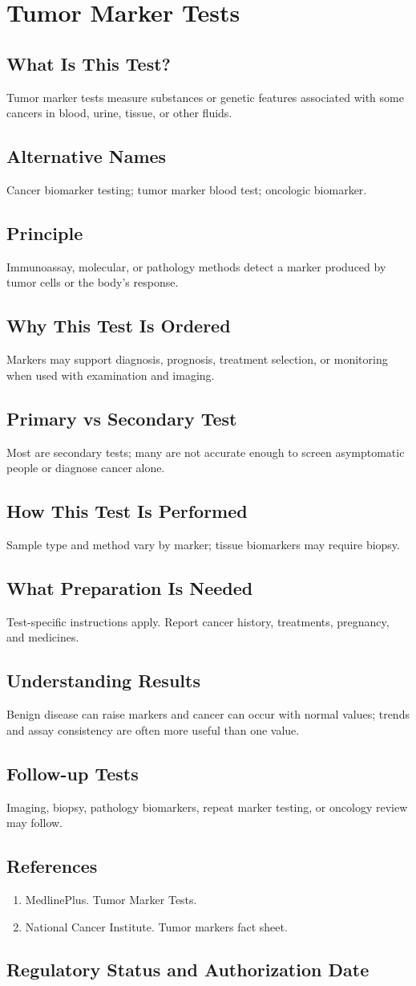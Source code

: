 \chapter{Tumor Marker Tests}
\section*{What Is This Test?} Tumor marker tests measure substances or genetic features associated with some cancers in blood, urine, tissue, or other fluids.\section*{Alternative Names} Cancer biomarker testing; tumor marker blood test; oncologic biomarker.\section*{Principle} Immunoassay, molecular, or pathology methods detect a marker produced by tumor cells or the body's response.\section*{Why This Test Is Ordered} Markers may support diagnosis, prognosis, treatment selection, or monitoring when used with examination and imaging.\section*{Primary vs Secondary Test} Most are secondary tests; many are not accurate enough to screen asymptomatic people or diagnose cancer alone.\section*{How This Test Is Performed} Sample type and method vary by marker; tissue biomarkers may require biopsy.\section*{What Preparation Is Needed} Test-specific instructions apply. Report cancer history, treatments, pregnancy, and medicines.\section*{Understanding Results} Benign disease can raise markers and cancer can occur with normal values; trends and assay consistency are often more useful than one value.\section*{Follow-up Tests} Imaging, biopsy, pathology biomarkers, repeat marker testing, or oncology review may follow.\section*{References} \begin{enumerate}\item MedlinePlus. Tumor Marker Tests.\item National Cancer Institute. Tumor markers fact sheet.\end{enumerate}\clearpage\section*{Regulatory Status and Authorization Date}\clearpage
